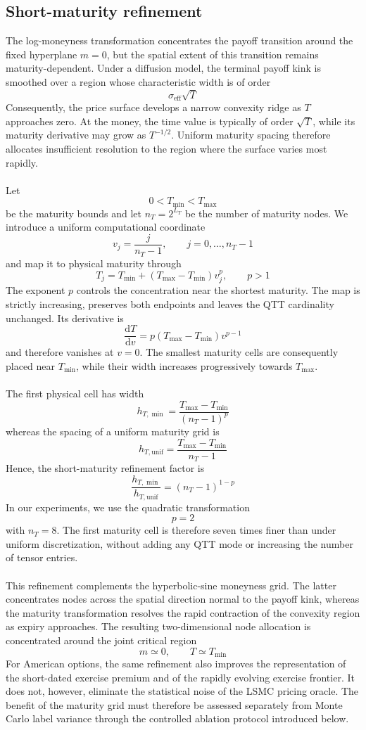 \documentclass{article}
\numberwithin{equation}{subsection}
\theoremstyle{definition}
\theoremstyle{remark}
\begin{document}
\subsection{Short-maturity refinement}
\label{subsec:short-maturity refinement}
The log-moneyness transformation concentrates the payoff transition around the fixed hyperplane \(m=0\), but the spatial extent of this transition remains maturity-dependent. Under a diffusion model, the terminal payoff kink is smoothed over a region whose characteristic width is of order
\[
\sigma_{\mathrm{eff}}\sqrt{T}
\]
Consequently, the price surface develops a narrow convexity ridge as \(T\) approaches zero. At the money, the time value is typically of order \(\sqrt{T}\), while its maturity derivative may grow as \(T^{-1/2}\). Uniform maturity spacing therefore allocates insufficient resolution to the region where the surface varies most rapidly.\\
\\
Let
\[
0<T_{\min}<T_{\max}
\]
be the maturity bounds and let \(n_T=2^{L_T}\) be the number of maturity nodes. We introduce a uniform computational coordinate
\[
v_j=\frac{j}{n_T-1},
\qquad
j=0,\ldots,n_T-1
\]
and map it to physical maturity through
\[
T_j
=
T_{\min}
+
\left(T_{\max}-T_{\min}\right)v_j^p,
\qquad
p>1
\]
The exponent \(p\) controls the concentration near the shortest maturity. The map is strictly increasing, preserves both endpoints and leaves the QTT cardinality unchanged. Its derivative is
\[
\frac{\mathrm{d}T}{\mathrm{d}v}
=
p\left(T_{\max}-T_{\min}\right)v^{p-1}
\]
and therefore vanishes at \(v=0\). The smallest maturity cells are consequently placed near \(T_{\min}\), while their width increases progressively towards \(T_{\max}\).\\
\\
The first physical cell has width
\[
h_{T,\min}
=
\frac{T_{\max}-T_{\min}}
     {(n_T-1)^p}
\]
whereas the spacing of a uniform maturity grid is
\[
h_{T,\mathrm{unif}}
=
\frac{T_{\max}-T_{\min}}
     {n_T-1}
\]
Hence, the short-maturity refinement factor is
\[
\frac{h_{T,\min}}{h_{T,\mathrm{unif}}}
=
(n_T-1)^{1-p}
\]
In our experiments, we use the quadratic transformation
\[
p=2
\]
with \(n_T=8\). The first maturity cell is therefore seven times finer than under uniform discretization, without adding any QTT mode or increasing the number of tensor entries.\\
\\
This refinement complements the hyperbolic-sine moneyness grid. The latter concentrates nodes across the spatial direction normal to the payoff kink, whereas the maturity transformation resolves the rapid contraction of the convexity region as expiry approaches. The resulting two-dimensional node allocation is concentrated around the joint critical region
\[
m\simeq 0,
\qquad
T\simeq T_{\min}
\]
For American options, the same refinement also improves the representation of the short-dated exercise premium and of the rapidly evolving exercise frontier. It does not, however, eliminate the statistical noise of the LSMC pricing oracle. The benefit of the maturity grid must therefore be assessed separately from Monte Carlo label variance through the controlled ablation protocol introduced below.
\end{document}
